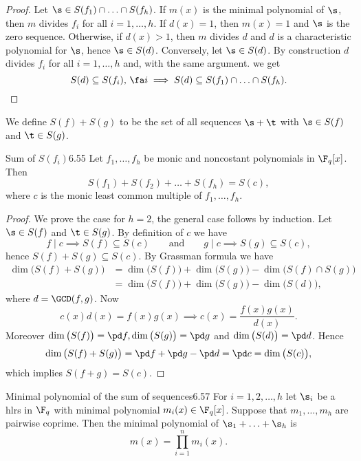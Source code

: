 \begin{proof}
	Let \(\s\in S(f_1)\cap \ldots \cap S(f_h)\). If \(m(x)\) is the minimal polynomial of \(\s\), then \(m\) divides \(f_i\) for all \(i=1,\ldots,h\). If \(d(x)=1\), then \(m(x)=1\) and \(\s\) is the zero sequence.
	Otherwise, if \(d(x)>1\), then \(m\) divides \(d\) and \(d\) is a characteristic polynomial for \(\s\), hence \(\s \in S(d)\).
	Conversely, let \(\s\in S(d)\). By construction \(d\) divides \(f_i\) for all \(i=1,\ldots,h\) and, with the same argument. we get 
	\[
		S(d) \subseteq S(f_i),\,\fa i \implies S(d) \subseteq S(f_1)\cap \ldots \cap S(f_h).\qedhere
	\]
\end{proof}

\begin{notz}
	We define \(S(f)+S(g)\) to be the set of all sequences \(\s+\t\) with \(\s\in S(f)\) and \(\t\in S(g)\).
\end{notz}

\begin{teor}{Sum of \(S(f_i)\)}{6.55}
	Let \(f_1,\ldots,f_h\) be monic and noncostant polynomials in \(\F_q[x]\). Then
	\[
		S(f_1)+S(f_2) + \ldots + S(f_h) = S(c),
	\]
	where \(c\) is the monic least common multiple of \(f_1,\ldots,f_h\).
\end{teor}

\begin{proof}
	We prove the case for \(h=2\), the general case follows by induction.
	Let \(\s\in S(f)\) and \(\t\in S(g)\). By definition of \(c\) we have
	\[
		f\mid c \implies S(f)\subseteq S(c) \qquad\text{and}\qquad g\mid c \implies S(g)\subseteq S(c),
	\]
	hence \(S(f)+S(g)\subseteq S(c)\).
	By Grassman formula we have
	\begin{align*}
		\dim\big(S(f)+S(g)\big) & = \dim\big(S(f)\big) + \dim\big(S(g)\big) - \dim\big(S(f)\cap S(g)\big) \\
		                        & = \dim\big(S(f)\big) + \dim\big(S(g)\big) - \dim\big(S(d)\big),
	\end{align*}
	where \(d=\GCD(f,g)\). Now
	\[
		c(x)d(x) = f(x)g(x) \implies c(x) = \frac{f(x)g(x)}{d(x)}.
	\]
	Moreover \(\dim\big(S(f)\big)=\pd f, \dim\big(S(g)\big) = \pd g\) and \(\dim\big(S(d)\big)=\pd d\). Hence
	\[
		\dim\big(S(f)+S(g)\big) = \pd f + \pd g - \pd d = \pd c = \dim\big(S(c)\big),
	\]
	which implies \(S(f+g)=S(c)\).
\end{proof}

\begin{teor}{Minimal polynomial of the sum of sequences}{6.57}
	For \(i=1,2,\ldots,h\) let \(\s_i\) be a hlrs in \(\F_q\) with minimal polynomial \(m_i(x)\in\F_q[x]\).
	Suppose that \(m_1,\ldots,m_h\) are pairwise coprime. Then the minimal polynomial of \(\s_1+\ldots+\s_h\) is
	\[
		m(x) = \prod_{i=1}^n m_i(x).
	\]
\end{teor}

